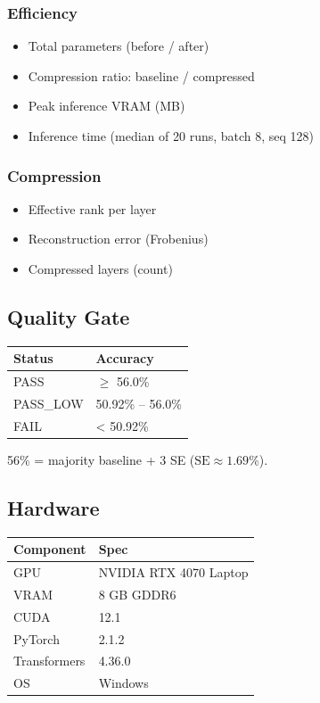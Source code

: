 \subsubsection{Efficiency}

\begin{itemize}
\item Total parameters (before / after)
\item Compression ratio: baseline / compressed
\item Peak inference VRAM (MB)
\item Inference time (median of 20 runs, batch 8, seq 128)

\end{itemize}
\subsubsection{Compression}

\begin{itemize}
\item Effective rank per layer
\item Reconstruction error (Frobenius)
\item Compressed layers (count)

\end{itemize}
\subsection{Quality Gate}

\begin{table}[H]
\centering
\small
\begin{tabular}{ll}
\toprule
\textbf{Status} & \textbf{Accuracy} \\
\midrule
PASS & $\ge$ 56.0\% \\
PASS\_LOW & 50.92\% -- 56.0\% \\
FAIL & \textless{} 50.92\% \\
\bottomrule
\end{tabular}
\end{table}

56\% = majority baseline + 3 SE ($\text{SE} \approx 1.69\%$).

\subsection{Hardware}

\begin{table}[H]
\centering
\small
\begin{tabular}{ll}
\toprule
\textbf{Component} & \textbf{Spec} \\
\midrule
GPU & NVIDIA RTX 4070 Laptop \\
VRAM & 8 GB GDDR6 \\
CUDA & 12.1 \\
PyTorch & 2.1.2 \\
Transformers & 4.36.0 \\
OS & Windows \\
\bottomrule
\end{tabular}
\end{table}

